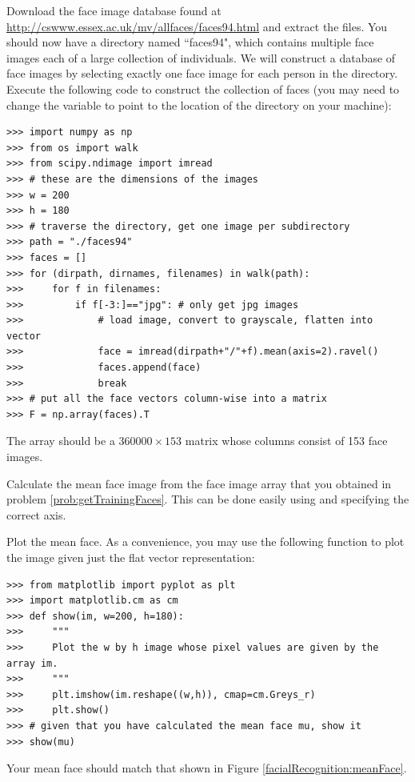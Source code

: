 \begin{problem}
\label{prob:getTrainingFaces}
Download the  face image database found at \url{http://cswww.essex.ac.uk/mv/allfaces/faces94.html} and extract the files.
You should now have a directory named ``faces94", which contains multiple face images each of a large collection of individuals.
We will construct a database of face images by selecting exactly one face image for each person in the directory.
Execute the following code to construct the collection of faces (you may need to change the variable  to point to the location
of the  directory on your machine):
\begin{lstlisting}
>>> import numpy as np
>>> from os import walk
>>> from scipy.ndimage import imread
>>> # these are the dimensions of the images
>>> w = 200
>>> h = 180
>>> # traverse the directory, get one image per subdirectory
>>> path = "./faces94"
>>> faces = []
>>> for (dirpath, dirnames, filenames) in walk(path):
>>>     for f in filenames:
>>>         if f[-3:]=="jpg": # only get jpg images
>>>             # load image, convert to grayscale, flatten into vector
>>>             face = imread(dirpath+"/"+f).mean(axis=2).ravel()
>>>             faces.append(face)
>>>             break
>>> # put all the face vectors column-wise into a matrix
>>> F = np.array(faces).T
\end{lstlisting}
The array  should be a $360000 \times 153$ matrix whose columns consist of 153 face images.
\end{problem}
\begin{problem}
\label{prob:meanFace}
Calculate the mean face image  from the face image array  that you obtained in problem \ref{prob:getTrainingFaces}.
This can be done easily using  and specifying the correct axis.

Plot the mean face.
As a convenience, you may use the following function to plot the image given just the flat vector representation:
\begin{lstlisting}
>>> from matplotlib import pyplot as plt
>>> import matplotlib.cm as cm
>>> def show(im, w=200, h=180):
>>>     """
>>>     Plot the w by h image whose pixel values are given by the array im.
>>>     """
>>>     plt.imshow(im.reshape((w,h)), cmap=cm.Greys_r)
>>>     plt.show()
>>> # given that you have calculated the mean face mu, show it
>>> show(mu)
\end{lstlisting}
Your mean face should match that shown in Figure \ref{facialRecognition:meanFace}.
\end{problem}
